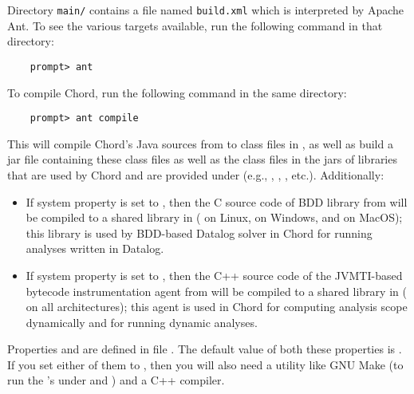 Directory {\tt main/} contains a file named {\tt build.xml} which is
interpreted by Apache Ant.  To see the various targets available, run
the following command in that directory:

\begin{verbatim}
    prompt> ant
\end{verbatim}

To compile Chord, run the following command in the same directory:

\begin{verbatim}
    prompt> ant compile
\end{verbatim}

This will compile Chord's Java sources from  to class files
in , as well as build a jar file  containing
these class files as well as the class files in the jars of libraries that are used by Chord
and are provided under  (e.g., , ,
, etc.).
Additionally:

\begin{itemize}
\item

If system property  is set to ,
then the C source code of BDD library  
from  will be compiled to a shared library in 
( on Linux,  on Windows, and
 on MacOS); this library is used 
by BDD-based Datalog solver  
in Chord for running analyses written in Datalog.

\item

If system property  is set to ,
then the C++ source code of the JVMTI-based bytecode instrumentation agent from
 will be compiled to a shared library in 
( on all architectures); this agent is
used in Chord for computing analysis scope dynamically and for running
dynamic analyses.
\end{itemize}

Properties  and  are defined in file .  The
default value of both these properties is .
If you set either of them to , then you will also need a utility like GNU Make (to run the
's under  and ) and a C++ compiler.

